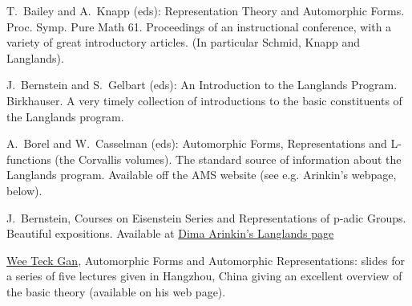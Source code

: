 {T.~Bailey and A.~Knapp (eds): Representation Theory and Automorphic Forms. Proc. Symp. Pure Math 61. Proceedings of an instructional conference, with a variety of great introductory articles. (In particular Schmid, Knapp and Langlands).

J.~Bernstein and S.~Gelbart (eds): An Introduction to the Langlands Program. Birkhauser. A very timely collection of introductions to the basic constituents of the Langlands program.

A.~Borel and W.~Casselman (eds): Automorphic Forms, Representations and L-functions (the Corvallis volumes). The standard source of information about the Langlands program. Available off the AMS website (see e.g. Arinkin's webpage, below).

J.~Bernstein, Courses on Eisenstein Series and Representations of p-adic Groups. Beautiful expositions. Available at \href{http://www.math.uchicago.edu/~arinkin/langlands}{Dima Arinkin's Langlands page}

\href{http://www.math.ucsd.edu/~wgan}{Wee Teck Gan}, Automorphic Forms and Automorphic Representations: slides for a series of five lectures given in Hangzhou, China giving an excellent overview of the basic theory (available on his web page).}